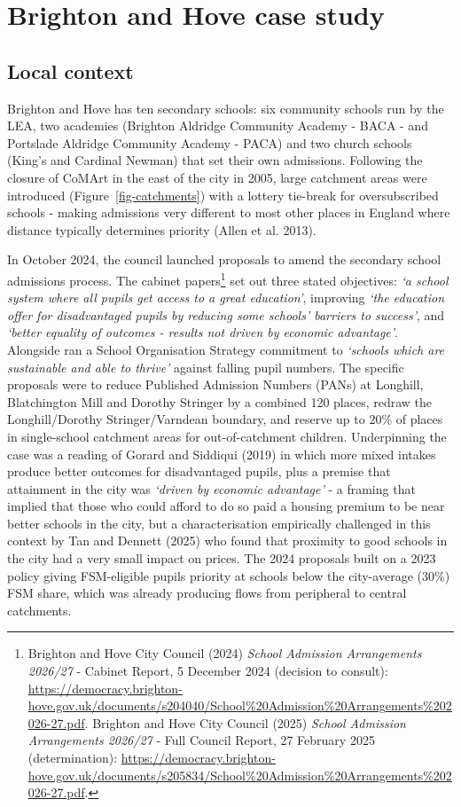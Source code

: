 \documentclass[
  12pt,
  titlepage]{article}
\begin{document}
\section{Brighton and Hove case
study}\label{brighton-and-hove-case-study}

\subsection{Local context}\label{local-context}

Brighton and Hove has ten secondary schools: six community schools run
by the LEA, two academies (Brighton Aldridge Community Academy - BACA -
and Portslade Aldridge Community Academy - PACA) and two church schools
(King's and Cardinal Newman) that set their own admissions. Following
the closure of CoMArt in the east of the city in 2005, large catchment
areas were introduced (Figure~\ref{fig-catchments}) with a lottery
tie-break for oversubscribed schools - making admissions very different
to most other places in England where distance typically determines
priority (Allen et al. 2013).

In October 2024, the council launched proposals to amend the secondary
school admissions process. The cabinet papers\footnote{Brighton and Hove
  City Council (2024) \emph{School Admission Arrangements 2026/27} -
  Cabinet Report, 5 December 2024 (decision to consult):
  \url{https://democracy.brighton-hove.gov.uk/documents/s204040/School\%20Admission\%20Arrangements\%202026-27.pdf}.
  Brighton and Hove City Council (2025) \emph{School Admission
  Arrangements 2026/27} - Full Council Report, 27 February 2025
  (determination):
  \url{https://democracy.brighton-hove.gov.uk/documents/s205834/School\%20Admission\%20Arrangements\%202026-27.pdf}.}
set out three stated objectives: \emph{`a school system where all pupils
get access to a great education'}, improving \emph{`the education offer
for disadvantaged pupils by reducing some schools' barriers to
success'}, and \emph{`better equality of outcomes - results not driven
by economic advantage'}. Alongside ran a School Organisation Strategy
commitment to \emph{`schools which are sustainable and able to thrive'}
against falling pupil numbers. The specific proposals were to reduce
Published Admission Numbers (PANs) at Longhill, Blatchington Mill and
Dorothy Stringer by a combined 120 places, redraw the Longhill/Dorothy
Stringer/Varndean boundary, and reserve up to 20\% of places in
single-school catchment areas for out-of-catchment children.
Underpinning the case was a reading of Gorard and Siddiqui (2019) in
which more mixed intakes produce better outcomes for disadvantaged
pupils, plus a premise that attainment in the city was \emph{`driven by
economic advantage'} - a framing that implied that those who could
afford to do so paid a housing premium to be near better schools in the
city, but a characterisation empirically challenged in this context by
Tan and Dennett (2025) who found that proximity to good schools in the
city had a very small impact on prices. The 2024 proposals built on a
2023 policy giving FSM-eligible pupils priority at schools below the
city-average (30\%) FSM share, which was already producing flows from
peripheral to central catchments.
\end{document}
